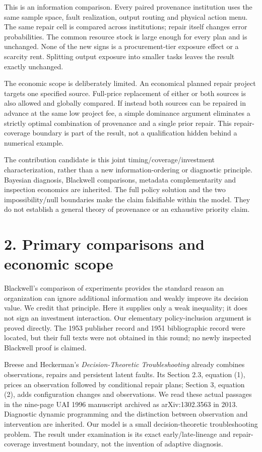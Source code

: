 \documentclass[
  11pt,
  a4paper,
]{article}
\begin{document}
This is an information comparison. Every paired provenance institution
uses the same sample space, fault realization, output routing and
physical action menu. The same repair cell is compared across
institutions; repair itself changes error probabilities. The common
resource stock is large enough for every plan and is unchanged. None of
the new signs is a procurement-tier exposure effect or a scarcity rent.
Splitting output exposure into smaller tasks leaves the result exactly
unchanged.

The economic scope is deliberately limited. An economical planned repair
project targets one specified source. Full-price replacement of either
or both sources is also allowed and globally compared. If instead both
sources can be repaired in advance at the same low project fee, a simple
dominance argument eliminates a strictly optimal combination of
provenance and a single prior repair. This repair-coverage boundary is
part of the result, not a qualification hidden behind a numerical
example.

The contribution candidate is this joint timing/coverage/investment
characterization, rather than a new information-ordering or diagnostic
principle. Bayesian diagnosis, Blackwell comparisons, metadata
complementarity and inspection economics are inherited. The full policy
solution and the two impossibility/null boundaries make the claim
falsifiable within the model. They do not establish a general theory of
provenance or an exhaustive priority claim.

\section{2. Primary comparisons and economic
scope}\label{primary-comparisons-and-economic-scope}

Blackwell's comparison of experiments provides the standard reason an
organization can ignore additional information and weakly improve its
decision value. We credit that principle. Here it supplies only a weak
inequality; it does not sign an investment interaction. Our elementary
policy-inclusion argument is proved directly. The 1953 publisher record
and 1951 bibliographic record were located, but their full texts were
not obtained in this round; no newly inspected Blackwell proof is
claimed.

Breese and Heckerman's \emph{Decision-Theoretic Troubleshooting} already
combines observations, repairs and persistent latent faults. Its Section
2.3, equation (1), prices an observation followed by conditional repair
plans; Section 3, equation (2), adds configuration changes and
observations. We read these actual passages in the nine-page UAI 1996
manuscript archived as arXiv:1302.3563 in 2013. Diagnostic dynamic
programming and the distinction between observation and intervention are
inherited. Our model is a small decision-theoretic troubleshooting
problem. The result under examination is its exact early/late-lineage
and repair-coverage investment boundary, not the invention of adaptive
diagnosis.
\end{document}
